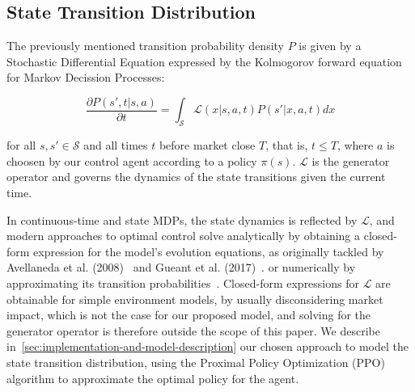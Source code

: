 \subsection{State Transition Distribution}
\label{subsec:state-transition-distribution}

The previously mentioned transition probability density $P$ is given by a Stochastic Differential Equation expressed by the Kolmogorov
forward equation for Markov Decission Processes:

\begin{equation}
    \label{eq:equation2}
    \frac{\partial P(s', t | s, a)}{\partial t}  = \int_{\mathcal{S}} \mathcal{L}(x | s, a, t) P(s'| x, a, t) dx
\end{equation}

for all $s, s' \in \mathcal{S}$ and all times $t$ before market close $T$, that is, $t \le T$,
where $a$ is choosen by our control agent according to a policy $\pi (s)$.
$\mathcal{L}$ is the generator operator and governs the dynamics of the state transitions given the current time.

In continuous-time and state MDPs, the state dynamics is reflected by $\mathcal{L}$, and modern approaches to optimal control
solve analytically by obtaining a closed-form expression for the model's evolution equations, as originally tackled by
Avellaneda et al. (2008)~\cite{Avellaneda2008} and Gueant et al. (2017)~\cite{Gueant2017}.
or numerically by approximating its transition probabilities~\cite{Gueant2022, Selser2021a, FalcesMarin2022}.
Closed-form expressions for $\mathcal{L}$ are obtainable for simple environment models, by usually disconsidering market impact,
which is not the case for our proposed model, and solving for the generator operator is therefore outside the scope of this paper.
We describe in~\autoref{sec:implementation-and-model-description} our chosen approach to model the state transition distribution,
using the Proximal Policy Optimization (PPO) algorithm to approximate the optimal policy for the agent.
